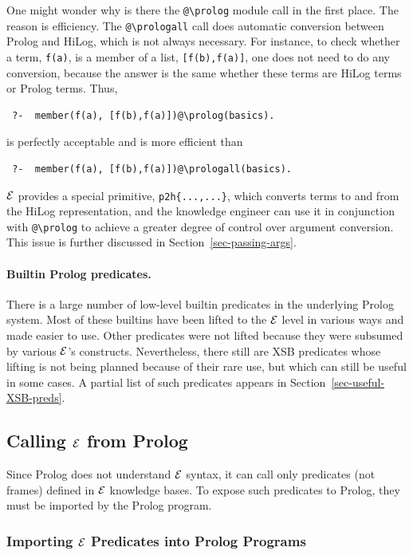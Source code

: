 \documentclass[11pt]{article}
\newcommand{\ERGO}{\mbox{\ensuremath{\cal{E}}\smaller{{\sc{RGO}}}}\xspace}
\newcommand{\FLSYSTEM}{\ERGO}
\newcommand{\bs}{\textbackslash}
\begin{document}
One might wonder why is there the {\tt @\bs{}prolog} module call in the first
place. The reason is efficiency. The {\tt @\bs{}prologall} call does automatic
conversion between Prolog and HiLog, which is not always necessary. For
instance, to check whether a term, {\tt f(a)}, is a member of a list,
{\tt [f(b),f(a)]}, one does not need to do any conversion, because the
answer is the same whether these terms are HiLog terms or Prolog
terms. Thus,
\begin{verbatim}
 ?-  member(f(a), [f(b),f(a)])@\prolog(basics).
\end{verbatim}
is perfectly acceptable and is more efficient than
\begin{verbatim}
 ?-  member(f(a), [f(b),f(a)])@\prologall(basics).
\end{verbatim}
\FLSYSTEM provides a special primitive, {\tt p2h\{...,...\}}, which converts terms to
and from the HiLog representation, and the knowledge engineer can use it in
conjunction with {\tt @\bs{}prolog} to achieve a greater degree of control
over argument conversion. This issue is further discussed in
Section~\ref{sec-passing-args}.

\paragraph{Builtin Prolog predicates.}
There is a large number of low-level builtin predicates in the
underlying Prolog system. Most of these builtins
have been lifted to the \FLSYSTEM
level in various ways and made easier to use. Other predicates
were not lifted because they were subsumed by various
\FLSYSTEM's constructs. Nevertheless, there still are XSB predicates whose
lifting is not being planned because of their rare
use, but which can still be useful in some cases.
A partial list of such predicates appears in Section~\ref{sec-useful-XSB-preds}.


\subsection{Calling \FLSYSTEM from Prolog}\label{sec-flora-from-prolog}

Since Prolog does not understand \FLSYSTEM syntax, it can call only
predicates (not frames) defined in \FLSYSTEM knowledge bases. To expose such
predicates to Prolog,
they must be imported by the Prolog program.

\subsubsection{Importing \FLSYSTEM Predicates into Prolog Programs}
\end{document}
